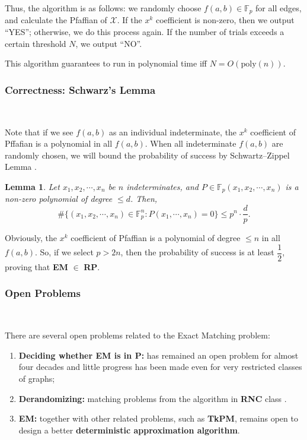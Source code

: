 \documentclass[11pt]{article}
\theoremstyle{plain}
\newtheorem{lemma}{Lemma}[section]
\begin{document}
Thus, the algorithm is as follows: we randomly choose $f(a,b)\in \mathbb{F}_p$ for all edges, and calculate the Pfaffian of $\mathcal{X}$. If the $x^k$ coefficient is non-zero, then we output ``YES''; otherwise, we do this process again. If the number of trials exceeds a certain threshold $N$, we output ``NO''.

This algorithm guarantees to run in polynomial time iff $N=O(\text{poly}(n))$.

\subsubsection{Correctness: Schwarz's Lemma}\

Note that if we see $f(a,b)$ as an individual indeterminate, the $x^k$ coefficient of Pffafian is a polynomial in all $f(a,b)$. When all indeterminate $f(a,b)$ are randomly chosen, we will bound the probability of success by Schwartz–Zippel Lemma \cite{10.1145/322217.322225}.

\begin{lemma}
\label{schwarz}
Let $x_1,x_2,\cdots,x_n$ be $n$ indeterminates, and $P\in \mathbb{F}_p(x_1,x_2,\cdots,x_n)$ is a non-zero polynomial of degree $\le d$. Then,
$$\#\{(x_1,x_2,\cdots,x_n)\in \mathbb{F}_p^n:P(x_1,\cdots,x_n)=0\}\le p^n\cdot \dfrac{d}{p}.$$
\end{lemma}

Obviously, the $x^k$ coefficient of Pfaffian is a polynomial of degree $\le n$ in all $f(a,b)$. So, if we select $p>2n$, then the probability of success is at least $\dfrac{1}{2}$, proving that \textbf{EM} $\in$ \textbf{RP}.

\subsubsection{Open Problems}\

There are several open problems related to the Exact Matching problem: 
\begin{enumerate}
    \item \textbf{Deciding whether EM is in P:}  has remained an open problem for almost four decades and little progress has been made even for very restricted classes of graphs;
    \item \textbf{Derandomizing:} matching problems from the algorithm in \textbf{RNC} class \cite{svensson2017matching}.
    \item \textbf{EM:} together with other related problems, such as \textbf{TkPM}, remains open to design a better \textbf{deterministic approximation algorithm}.
\end{enumerate}
\end{document}

